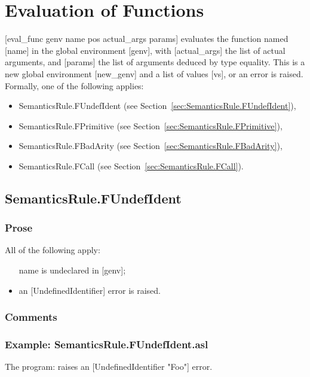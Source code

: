 \documentclass{book}
\begin{document}
\section{Evaluation of Functions}
[eval\_func genv name pos actual\_args params] evaluates the function named
[name] in the global environment [genv], with [actual\_args] the list of actual
arguments, and [params] the list of arguments deduced by type equality. This is
a new global environment [new\_genv] and a list of values [vs], or an error is
raised. Formally, one of the following applies:
\begin{itemize}
\item SemanticsRule.FUndefIdent (see Section~\ref{sec:SemanticsRule.FUndefIdent}),
\item SemanticsRule.FPrimitive (see Section~\ref{sec:SemanticsRule.FPrimitive}),
\item SemanticsRule.FBadArity (see Section~\ref{sec:SemanticsRule.FBadArity}),
\item SemanticsRule.FCall (see Section~\ref{sec:SemanticsRule.FCall}).
\end{itemize}

\subsection{SemanticsRule.FUndefIdent \label{sec:SemanticsRule.FUndefIdent}}

  \subsubsection{Prose}
  All of the following apply:
  \begin{itemize}
  \item [name] is undeclared in [genv];
  \item an [UndefinedIdentifier] error is raised.
  \end{itemize}

  \subsubsection{Comments}

  \subsubsection{Example: SemanticsRule.FUndefIdent.asl}
  The program:
  raises an [UndefinedIdentifier "Foo"] error.
\end{document}

